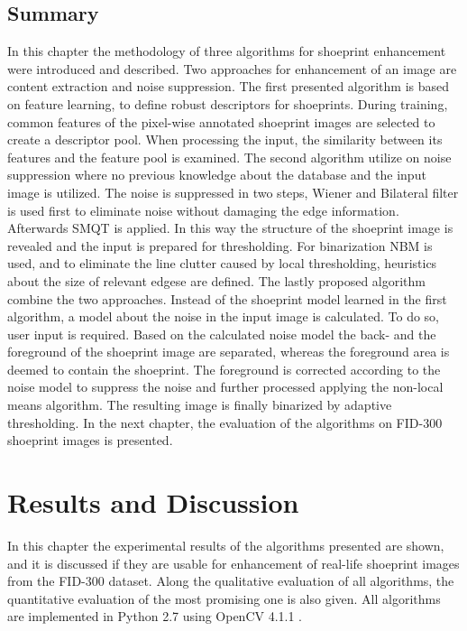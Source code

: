 \documentclass[draft,final]{vutinfth} %
\begin{document}
\section{Summary}
\par
In this chapter the methodology of three algorithms for shoeprint enhancement were introduced and described.
Two approaches for enhancement of an image are content extraction and noise suppression.
The first presented algorithm is based on feature learning, to define robust descriptors for shoeprints.
During training, common features of the pixel-wise annotated shoeprint images are selected to create a descriptor pool.
When processing the input, the similarity between its features and the feature pool is examined.
The second algorithm utilize on noise suppression where no previous knowledge about the database and the input image is utilized.
The noise is suppressed in two steps, Wiener and Bilateral filter is used first to eliminate noise without damaging the edge information.
Afterwards SMQT is applied.
In this way the structure of the shoeprint image is revealed and the input is prepared for thresholding.
For binarization NBM is used, and to eliminate the line clutter caused by local thresholding, heuristics about the size of relevant edgese are defined.
The lastly proposed algorithm combine the two approaches.
Instead of the shoeprint model learned in the first algorithm, a model about the noise in the input image is calculated.
To do so, user input is required.
Based on the calculated noise model the back- and the foreground of the shoeprint image are separated, whereas the foreground area is deemed to contain the shoeprint.
The foreground is corrected according to the noise model to suppress the noise and further processed applying the non-local means algorithm.
The resulting image is finally binarized by adaptive thresholding.
In the next chapter, the evaluation of the algorithms on FID-300 shoeprint images is presented. 
\chapter{Results and Discussion}
\label{results}
\par
In this chapter the experimental results of the algorithms presented are shown, and it is discussed if they are usable for enhancement of real-life shoeprint images from the FID-300 dataset.
Along the qualitative evaluation of all algorithms, the quantitative evaluation of the most promising one is also given.
All algorithms are implemented in Python 2.7 \cite{van1995python} using OpenCV 4.1.1 \cite{opencv_library}.
\end{document}
